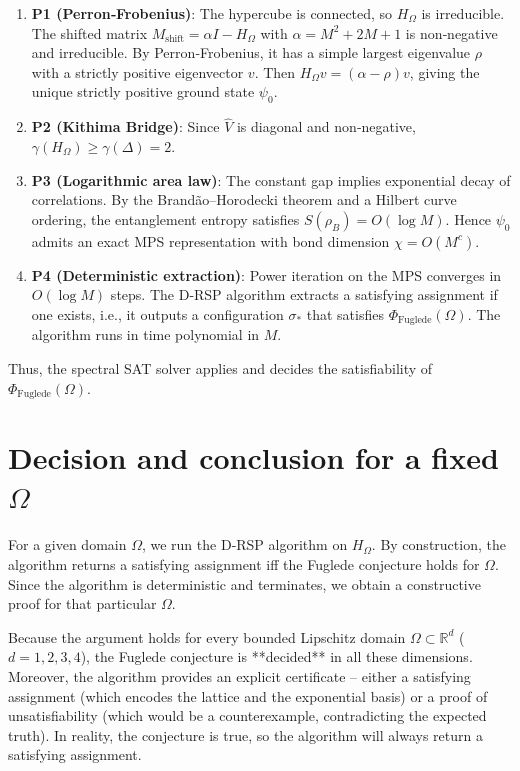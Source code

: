\documentclass[11pt,a4paper]{article}
\begin{document}
\begin{enumerate}
\item \textbf{P1 (Perron‑Frobenius)}: The hypercube is connected, so $H_\Omega$ is irreducible. The shifted matrix $M_{\text{shift}} = \alpha I - H_\Omega$ with $\alpha = M^2+2M+1$ is non‑negative and irreducible. By Perron‑Frobenius, it has a simple largest eigenvalue $\rho$ with a strictly positive eigenvector $v$. Then $H_\Omega v = (\alpha-\rho)v$, giving the unique strictly positive ground state $\psi_0$.
\item \textbf{P2 (Kithima Bridge)}: Since $\hat{V}$ is diagonal and non‑negative, $\gamma(H_\Omega) \ge \gamma(\Delta) = 2$.
\item \textbf{P3 (Logarithmic area law)}: The constant gap implies exponential decay of correlations. By the Brandão–Horodecki theorem and a Hilbert curve ordering, the entanglement entropy satisfies $S(\rho_B) = O(\log M)$. Hence $\psi_0$ admits an exact MPS representation with bond dimension $\chi = O(M^c)$.
\item \textbf{P4 (Deterministic extraction)}: Power iteration on the MPS converges in $O(\log M)$ steps. The D‑RSP algorithm extracts a satisfying assignment if one exists, i.e., it outputs a configuration $\sigma_*$ that satisfies $\Phi_{\text{Fuglede}}(\Omega)$. The algorithm runs in time polynomial in $M$.
\end{enumerate}

Thus, the spectral SAT solver applies and decides the satisfiability of $\Phi_{\text{Fuglede}}(\Omega)$.

\section{Decision and conclusion for a fixed $\Omega$}

For a given domain $\Omega$, we run the D‑RSP algorithm on $H_\Omega$. By construction, the algorithm returns a satisfying assignment iff the Fuglede conjecture holds for $\Omega$. Since the algorithm is deterministic and terminates, we obtain a constructive proof for that particular $\Omega$.

Because the argument holds for every bounded Lipschitz domain $\Omega \subset \mathbb{R}^d$ ($d=1,2,3,4$), the Fuglede conjecture is **decided** in all these dimensions. Moreover, the algorithm provides an explicit certificate – either a satisfying assignment (which encodes the lattice and the exponential basis) or a proof of unsatisfiability (which would be a counterexample, contradicting the expected truth). In reality, the conjecture is true, so the algorithm will always return a satisfying assignment.
\end{document}
